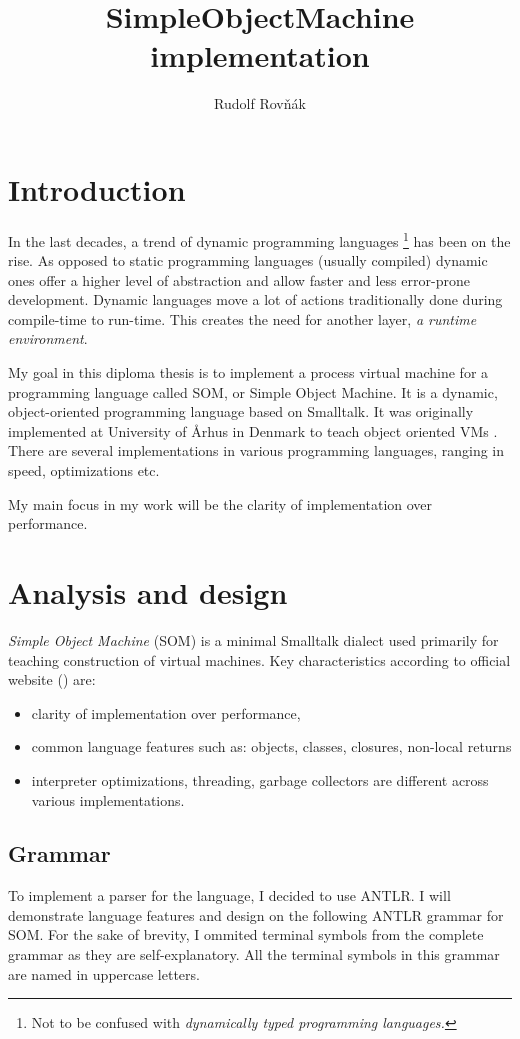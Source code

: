 \documentclass[thesis=M,english]{FITthesis}[2019/12/23]
\title{SimpleObjectMachine implementation}
\author{Rudolf Rovňák} %
\begin{document}

\setcounter{secnumdepth}{3}
\chapter{Introduction}
In the last decades, a trend of dynamic programming languages \footnote{Not to be confused with \textit{dynamically typed programming languages.}} has been on the rise.
As opposed to static programming languages (usually compiled) dynamic ones offer a higher level of abstraction and allow faster and less error-prone development.
Dynamic languages move a lot of actions traditionally done during compile-time to run-time. This creates the need for another layer, \textit{a runtime environment}.

My goal in this diploma thesis is to implement a process virtual machine for a programming language called SOM, or Simple Object Machine. 
It is a dynamic, object-oriented programming language based on Smalltalk. It was originally implemented at University of Århus in Denmark to teach
object oriented VMs \cite{som-github}. There are several implementations in various programming languages, ranging in speed, optimizations etc.

My main focus in my work will be the clarity of implementation over performance. 

\chapter{Analysis and design}
\textit{Simple Object Machine} (SOM) is a minimal Smalltalk dialect used primarily for teaching construction of virtual machines. Key characteristics
according to official website (\cite{som-github}) are:
\begin{itemize}
	\item clarity of implementation over performance,
	\item common language features such as: objects, classes, closures, non-local returns
	\item interpreter optimizations, threading, garbage collectors are different
		across various implementations.
\end{itemize}

\section{Grammar}
To implement a parser for the language, I decided to use ANTLR. I will demonstrate language features and design on the following ANTLR grammar
for SOM. For the sake of brevity, I ommited terminal symbols from the complete grammar as they are self-explanatory. All the terminal symbols
in this grammar are named in uppercase letters.
\end{document}
